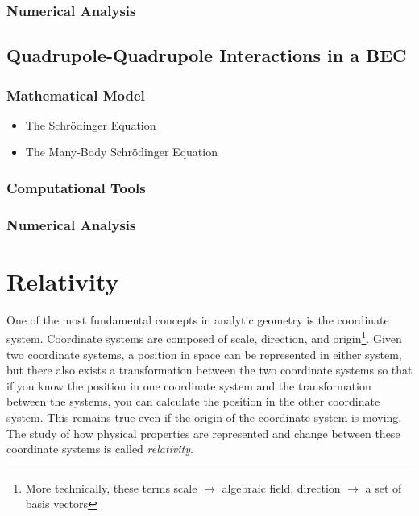 \documentclass{report}
\begin{document}
        \subsection{Numerical Analysis}

    \section{Quadrupole-Quadrupole Interactions in a BEC}

        \subsection{Mathematical Model}

            \begin{itemize}
                \item The Schr{\"o}dinger Equation
                \item The Many-Body Schr{\"o}dinger Equation
            \end{itemize}

        \subsection{Computational Tools}

        \subsection{Numerical Analysis}

\chapter{Relativity} \label{sec:relativity}

    One of the most fundamental concepts in analytic geometry is the coordinate system.  Coordinate systems are composed of scale, direction, and origin\footnote{More technically, these terms scale $\rightarrow$ algebraic field, direction $\rightarrow$ a set of basis vectors}.  Given two coordinate systems, a position in space can be represented in either system, but there also exists a transformation between the two coordinate systems so that if you know the position in one coordinate system and the transformation between the systems, you can calculate the position in the other coordinate system.  This remains true even if the origin of the coordinate system is moving.  The study of how physical properties are represented and change between these coordinate systems is called \emph{relativity}.  
    
\end{document}
